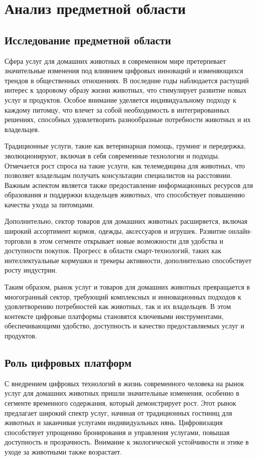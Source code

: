 \section{Анализ предметной области}

\subsection{Исследование предметной области}

Сфера услуг для домашних животных в современном мире претерпевает значительные изменения под влиянием цифровых инноваций и изменяющихся трендов в общественных отношениях. В последние годы наблюдается растущий интерес к здоровому образу жизни животных, что стимулирует развитие новых услуг и продуктов. Особое внимание уделяется индивидуальному подходу к каждому питомцу, что влечет за собой необходимость в интегрированных решениях, способных удовлетворить разнообразные потребности животных и их владельцев.

Традиционные услуги, такие как ветеринарная помощь, груминг и передержка, эволюционируют, включая в себя современные технологии и подходы. Отмечается рост спроса на такие услуги, как телемедицина для животных, что позволяет владельцам получать консультации специалистов на расстоянии. Важным аспектом является также предоставление информационных ресурсов для образования и поддержки владельцев животных, что способствует повышению качества ухода за питомцами.

Дополнительно, сектор товаров для домашних животных расширяется, включая широкий ассортимент кормов, одежды, аксессуаров и игрушек. Развитие онлайн-торговли в этом сегменте открывает новые возможности для удобства и доступности покупок. Прогресс в области смарт-технологий, таких как интеллектуальные кормушки и трекеры активности, дополнительно способствует росту индустрии.

Таким образом, рынок услуг и товаров для домашних животных превращается в многогранный сектор, требующий комплексных и инновационных подходов к удовлетворению потребностей как животных, так и их владельцев. В этом контексте цифровые платформы становятся ключевыми инструментами, обеспечивающими удобство, доступность и качество предоставляемых услуг и продуктов.

\subsection{Роль цифровых платформ}

С внедрением цифровых технологий в жизнь современного человека на рынок услуг для домашних животных пришли значительные изменения, особенно в сегменте временного содержания, который демонстрирует рост. Этот рынок предлагает широкий спектр услуг, начиная от традиционных гостиниц для животных и заканчивая услугами индивидуальных нянь. Цифровизация способствует упрощению бронирования и управления услугами, повышая доступность и прозрачность. Внимание к экологической устойчивости и этике в уходе за животными также возрастает.

